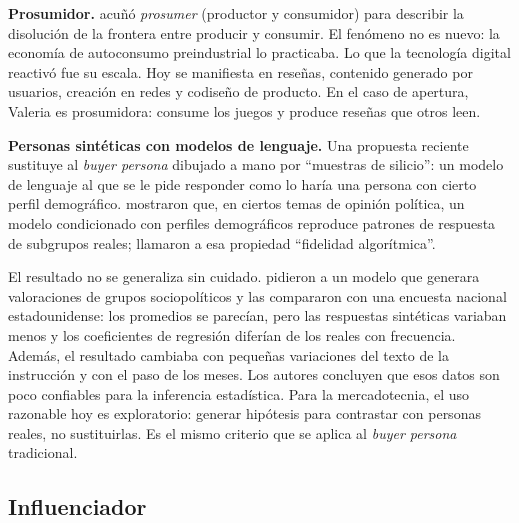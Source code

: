 \textbf{Prosumidor.} \textcite{toffler1980thirdwave} acuñó \textit{prosumer}
(productor y consumidor) para describir la disolución de la frontera entre
producir y consumir. El fenómeno no es nuevo: la economía de autoconsumo
preindustrial lo practicaba. Lo que la tecnología digital reactivó fue su
escala. Hoy se manifiesta en reseñas, contenido generado por usuarios,
creación en redes y codiseño de producto. En el caso de apertura, Valeria es
prosumidora: consume los juegos y produce reseñas que otros leen.

\begin{cajaFrontera}
\textbf{Personas sintéticas con modelos de lenguaje.} Una propuesta reciente
sustituye al \textit{buyer persona} dibujado a mano por \enquote{muestras de
silicio}: un modelo de lenguaje al que se le pide responder como lo haría una
persona con cierto perfil demográfico. \textcite{argyle2023} mostraron que, en
ciertos temas de opinión política, un modelo condicionado con perfiles
demográficos reproduce patrones de respuesta de subgrupos reales; llamaron a
esa propiedad \enquote{fidelidad algorítmica}.

El resultado no se generaliza sin cuidado. \textcite{bisbee2024} pidieron a un
modelo que generara valoraciones de grupos sociopolíticos y las compararon
con una encuesta nacional estadounidense: los promedios se parecían, pero
las respuestas sintéticas variaban menos y los coeficientes de regresión
diferían de los reales con frecuencia. Además, el resultado cambiaba con
pequeñas variaciones del texto de la instrucción y con el paso de los meses.
Los autores concluyen que esos datos son poco confiables para la inferencia
estadística. Para la mercadotecnia, el uso razonable hoy es exploratorio:
generar hipótesis para contrastar con personas reales, no sustituirlas. Es
el mismo criterio que se aplica al \textit{buyer persona} tradicional.
\end{cajaFrontera}

\subsection{Influenciador}
\label{sec:cap08-influ}

